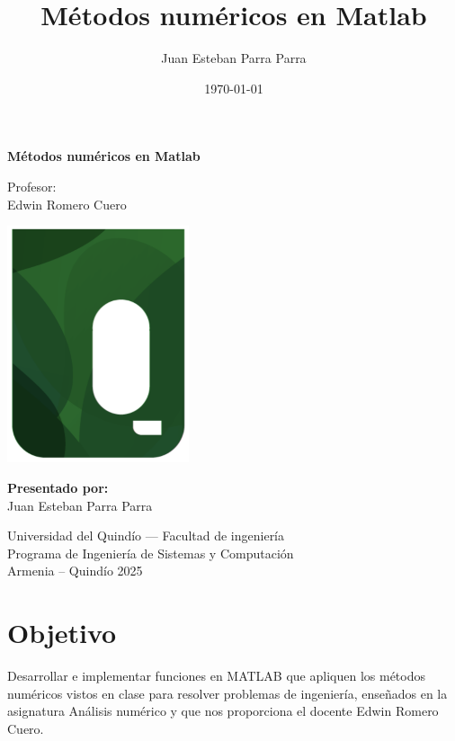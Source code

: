 \documentclass[12pt,a4paper]{article}
\title{Métodos numéricos en Matlab}
\author{Juan Esteban Parra Parra}
\date{\today}
\begin{document}
\begin{titlepage}
	\centering

	\vspace{2em}
	{\textbf{Métodos numéricos en Matlab}}

	{Profesor:}\\
	\vspace{0.1cm}
	{Edwin Romero Cuero}\\

	\vspace{1.2cm}

	\begin{center}
		\includegraphics[width=0.4\textwidth]{resources/uniquindio.png}
	\end{center}

	\vspace{1.1cm}
	{\textbf{Presentado por:}}\\
	\vspace{0.1cm}
	{Juan Esteban Parra Parra}\\

	\vfill{
		\vspace{1cm}
		\vspace{1cm}

		{Universidad del Quindío --- Facultad de ingeniería\\Programa de Ingeniería de Sistemas y Computación}\\
		\vspace{0.5cm}
		{Armenia -- Quindío 2025 }
	}

\end{titlepage}

\newpage
\tableofcontents
\newpage

\section{Objetivo}
Desarrollar e implementar funciones en MATLAB que apliquen los métodos numéricos vistos en clase para resolver problemas de ingeniería, enseñados en la asignatura Análisis numérico y que nos proporciona el docente Edwin Romero Cuero.
\end{document}

